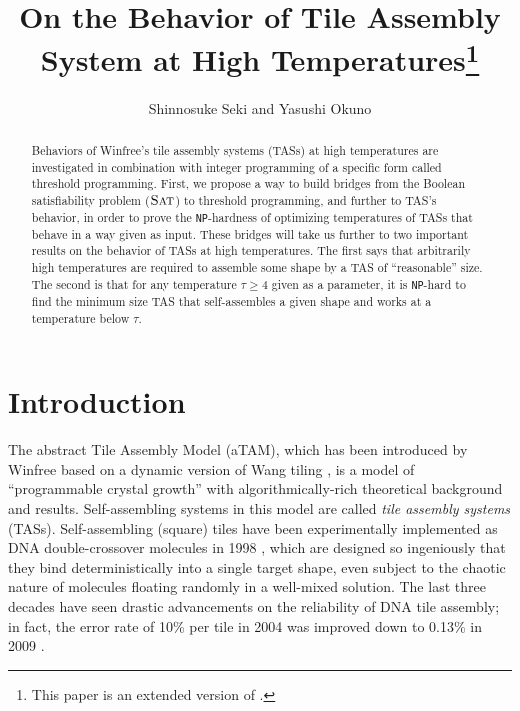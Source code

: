 \documentclass{article}
\title{On the Behavior of Tile Assembly System at High Temperatures\footnote{
This paper is an extended version of \cite{SekiOkuno2012}. 
}}
\author{Shinnosuke Seki and Yasushi Okuno}
\theoremstyle{remark}
\theoremstyle{definition}
\newcommand{\SAT}{\ensuremath{\mbox{\sc Sat}}}
\newcommand{\NP}{{\tt NP}}
\begin{document}
\maketitle

\begin{abstract}
	Behaviors of Winfree's tile assembly systems (TASs) at high temperatures are investigated in combination with integer programming of a specific form called threshold programming. 
	First, we propose a way to build bridges from the Boolean satisfiability problem ($\SAT$) to threshold programming, and further to TAS's behavior, in order to prove the \NP-hardness of optimizing temperatures of TASs that behave in a way given as input. 
	These bridges will take us further to two important results on the behavior of TASs at high temperatures. 
	The first says that arbitrarily high temperatures are required to assemble some shape by a TAS of ``reasonable'' size. 
	The second is that for any temperature $\tau \ge 4$ given as a parameter, it is \NP-hard to find the minimum size TAS that self-assembles a given shape and works at a temperature below $\tau$.   
\end{abstract}

	\section{Introduction}

The abstract Tile Assembly Model (aTAM), which has been introduced by Winfree \cite{Winfree1998} based on a dynamic version of Wang tiling \cite{Wang1961}, is a model of ``programmable crystal growth'' with algorithmically-rich theoretical background and results. 
Self-assembling systems in this model are called {\it tile assembly systems} (TASs). 
Self-assembling (square) tiles have been experimentally implemented as DNA double-crossover molecules in 1998 \cite{WiLiWeSe1998}, which are designed so ingeniously that they bind deterministically into a single target shape, even subject to the chaotic nature of molecules floating randomly in a well-mixed solution. 
The last three decades have seen drastic advancements on the reliability of DNA tile assembly; in fact, the error rate of 10\% per tile in 2004 was improved down to 0.13\% in 2009 \cite{BaScRoWi2009}. 
\end{document}
